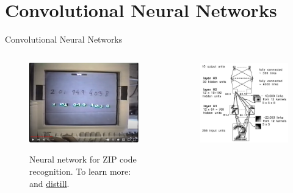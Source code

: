 \documentclass{beamer}
\begin{document}
\section{Convolutional Neural Networks}

\begin{frame}[fragile]{Convolutional Neural Networks}
    \begin{columns}
        \begin{column}{0.4\linewidth}  
            \begin{figure}
                \href{https://www.youtube.com/watch?v=FwFduRA_L6Q}{\includegraphics[width=0.9\linewidth]{CNNvideo}}
                \caption{Neural network for ZIP code recognition. To learn more: \cite{Olah_2014} and \href{https://distill.pub/}{distill}.}
                \label{Fig:CNNvideo}
            \end{figure}
        \end{column}
        \begin{column}{0.6\linewidth}
            \begin{figure}
                \includegraphics[width=0.9\linewidth]{CNN}

\end{figure}
\end{column}
\end{columns}
\end{frame}
\end{document}
